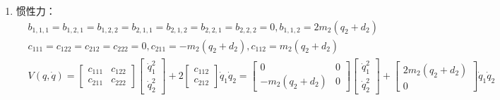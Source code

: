 \documentclass[
12pt, %
a4paper, 
oneside, %
headinclude,footinclude, %
]{scrartcl}
\begin{document}
{\begin{enumerate}
\begin{align*}
&= \begin{bmatrix} m_1 l_1^2 & 0 \\ 0 & 0 \end{bmatrix} + \begin{bmatrix} I_{zz1} & 0 \\ 0 & 0 \end{bmatrix} + \begin{bmatrix} m_2(d_2 + q_2)^2 & 0 \\ 0 & m_2 \end{bmatrix} + \begin{bmatrix} I_{zz2} & 0 \\ 0 & 0 \end{bmatrix} \\
&= \begin{bmatrix} I_{zz1} + I_{zz2} + m_1 l_1^2 + m_2(d_2 + q_2)^2 & 0 \\ 0 & m_2 \end{bmatrix}
\end{align*}
\item 惯性力：
\begin{align*}
&b_{1,1,1} = b_{1,2,1} = b_{1,2,2} = b_{2,1,1} = b_{2,1,2} = b_{2,2,1} = b_{2,2,2} = 0, b_{1,1,2} = 2m_2(q_2 + d_2) \\
&c_{111} = c_{122} = c_{212} = c_{222} = 0, c_{211} = -m_2(q_2 + d_2), c_{112} = m_2(q_2 + d_2) \\
&V(q,\dot{q}) = \begin{bmatrix} c_{111} & c_{122} \\ c_{211} & c_{222} \end{bmatrix} \begin{bmatrix} \dot{q}_1^2 \\ \dot{q}_2^2 \end{bmatrix} + 2\begin{bmatrix} c_{112} \\ c_{212} \end{bmatrix} \dot{q}_1\dot{q}_2 = \begin{bmatrix} 0 & 0 \\ -m_2(q_2 + d_2) & 0 \end{bmatrix} \begin{bmatrix} \dot{q}_1^2 \\ \dot{q}_2^2 \end{bmatrix} + \begin{bmatrix} 2m_2(q_2 + d_2) \\ 0 \end{bmatrix} \dot{q}_1\dot{q}_2
\end{align*}

\end{enumerate}}
\end{document}
